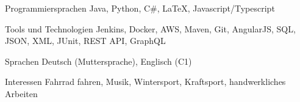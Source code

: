 

\begin{cvskills}


    
  \cvskill
    {Programmiersprachen} %
    {Java, Python, C\#, LaTeX, Javascript/Typescript} %
    
  \cvskill
    {Tools und Technologien} %
    {Jenkins, Docker, AWS, Maven, Git, AngularJS, SQL, JSON, XML, JUnit, REST API, GraphQL} %

  \cvskill
    {Sprachen} %
    {Deutsch (Muttersprache), Englisch (C1)} %
    
  \cvskill
    {Interessen} %
    {Fahrrad fahren, Musik, Wintersport, Kraftsport, handwerkliches Arbeiten } %
    


\end{cvskills}
